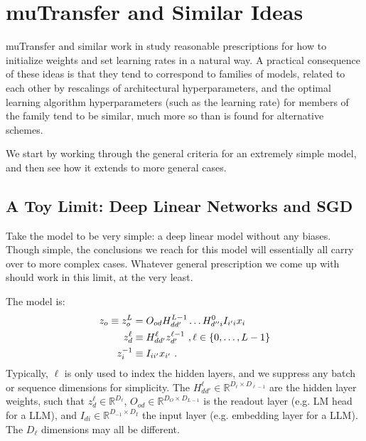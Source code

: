 \section{muTransfer and Similar Ideas}


muTransfer \cite{yang2022tensor} and similar work in \cite{physicalDL,
yaida2022metaprincipledfamilyhyperparameterscaling,doshi2023criticalinitializationwidedeep} study
reasonable prescriptions for how to initialize weights and set learning rates in a natural way. A
practical consequence of these ideas is that they tend to correspond to families of models, related
to each other by rescalings of architectural hyperparameters, and the optimal learning algorithm
hyperparameters (such as the learning rate) for members of the family tend to be similar, much more
so than is found for alternative schemes.

We start by working through the general criteria for an extremely simple model, and then see how it
extends to more general cases.


\subsection{A Toy Limit: Deep Linear Networks and SGD\label{app_mup_toy_limit}}

Take the model to be very simple: a deep linear model without any biases.  Though simple, the
conclusions we reach for this model will essentially all carry over to more complex cases. Whatever
general prescription we come up with should work in this limit, at the very least.

The model is:
\begin{align}
    z _{ o } \equiv  z ^{ L }_{ o } &= O _{ od } H ^{ L-1 }_{ d d' } \ldots H ^{ 0 } _{ d'' i }I _{ i 'i } x _{ i } \nonumber\\
    z ^{ \ell }_{ d } & \equiv H ^{ \ell }_{ d d' } z ^{ \ell-1 }_{ d' }  \ , \ell \in \left \{ 0, \ldots , L-1 \right \}\nonumber\\
    z ^{-1}_{ i } & \equiv I _{ i i' } x _{ i' }  \ . \label{app_eq_deep_linear_model}
\end{align}
Typically, $ \ell $ is only used to index the hidden layers, and we suppress any batch or sequence
dimensions for simplicity. The $ H ^{ \ell } _{ d d' } \in \mathbb{R} ^{ D _{ \ell  } \times D  _{
\ell-1 } } $  are the hidden layer weights, such that $ z_{ d }^{ \ell }\in \mathbb{R}^{ D_{
\ell } } $,  $O _{ o d } \in \mathbb{R} ^{ D _{O}\times D  _{ L-1 } } $ is the readout layer
(e.g. LM head for a LLM), and $I  _{ d i } \in \mathbb{R} ^{ D _{ -1} \times D  _{I} } $ the
input layer (e.g. embedding layer for a LLM). The $ D_{ \ell } $ dimensions may all be different.


